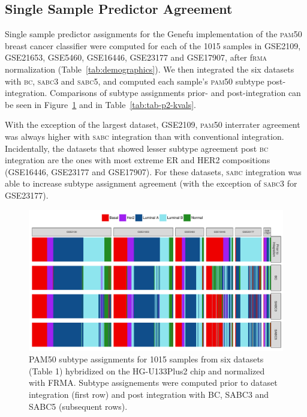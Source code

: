 \documentclass{article}\usepackage[]{graphicx}\usepackage[]{color}
\makeatletter
\def\maxwidth{ %
  \ifdim\Gin@nat@width>\linewidth
    \linewidth
  \else
    \Gin@nat@width
  \fi
}
\newenvironment{knitrout}{}{} %
\makeatother
\begin{document}
\subsection{Single Sample Predictor Agreement}
\label{sec:concordance}

Single sample predictor assignments for the Genefu implementation of the
\textsc{pam50} breast cancer classifier were computed for each of the 1015
samples in GSE2109, GSE21653, GSE5460, GSE16446, GSE23177 and GSE17907, after
f\textsc{rma} normalization (Table~\ref{tab:demographics}).  We then integrated
the six datasets with \textsc{bc}, \textsc{sabc3} and \textsc{sabc5}, and
computed each sample's \textsc{pam50} subtype post-integration.  Comparisons of
subtype assignments prior- and post-integration can be seen in
Figure~\ref{fig:pam50-concordance-plot} and in Table~\ref{tab:tab-p2-kvals}.

With the exception of the largest dataset, GSE2109, \textsc{pam50} interrater
agreement was always higher with \textsc{sabc} integration than with
conventional integration.  Incidentally, the datasets that showed lesser subtype
agreement post \textsc{bc} integration are the ones with most extreme ER and
HER2 compositions (GSE16446, GSE23177 and GSE17907).  For these datasets,
\textsc{sabc} integration was able to increase subtype assignment agreement
(with the exception of \textsc{sabc3} for GSE23177).





\begin{knitrout}
\color{fgcolor}\begin{figure}

{\centering \includegraphics[width=\maxwidth]{figure/pam50-concordance-plot-1} 

}

\caption[PAM50 subtype assignments for 1015 samples from six datasets (Table 1) hybridized on the HG-U133Plus2 chip and normalized with FRMA]{PAM50 subtype assignments for 1015 samples from six datasets (Table 1) hybridized on the HG-U133Plus2 chip and normalized with FRMA.  Subtype assignements were computed prior to dataset integration (first row) and post integration with BC, SABC3 and SABC5 (subsequent rows).}\label{fig:pam50-concordance-plot}
\end{figure}


\end{knitrout}
\end{document}
